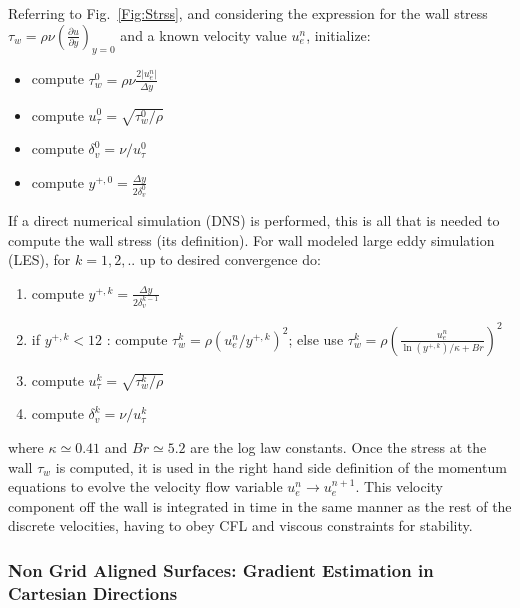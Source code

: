 Referring to Fig.~\ref{Fig:Strss}, and considering the expression for the wall stress $\tau_w = \rho \nu \left( \frac{\partial u}{\partial y} \right)_{y=0}$ and a known velocity value $u_e^n$, initialize:
%
\begin{itemize}
   \item compute $\tau_w^0 = \rho \nu \frac{2 |u_e^n|}{\Delta y}$
   \item compute $u_\tau^0 = \sqrt{\tau_w^0/\rho}$
   \item compute $\delta_v^0 = \nu/u_\tau^0$
   \item compute $y^{+,0} = \frac{\Delta y}{2 \delta_v^0}$
\end{itemize}
%
If a direct numerical simulation (DNS) is performed, this is all that is needed to compute the wall stress (its definition). For wall modeled large eddy simulation (LES), for $k=1,2,..$ up to desired convergence do:
%
\begin{enumerate}
   \item compute $y^{+,k} = \frac{\Delta y}{2 \delta_v^{k-1}}$
   \item if $y^{+,k} < 12$ : compute $\tau_w^k = \rho \left( u_e^n / y^{+,k} \right)^2$; else use 
   $\tau_w^k =\rho \left( \frac{u_e^n}{\ln{(y^{+,k})}/\kappa + Br} \right)^2$
   \item compute $u_\tau^k = \sqrt{\tau_w^k/\rho}$
   \item compute $\delta_v^k = \nu/u_\tau^k$
\end{enumerate}
%
where  $\kappa \simeq 0.41$ and $Br \simeq 5.2$ are the log law constants. Once the stress at the wall $\tau_w$ is computed, it is used in the right hand side definition of the momentum equations to evolve the velocity flow variable $u_e^n \rightarrow u_e^{n+1}$. This velocity component
off the wall is integrated in time in the same manner as the rest of the discrete velocities, having to obey CFL and viscous constraints for stability.

\subsubsection{Non Grid Aligned Surfaces: Gradient Estimation in Cartesian Directions}

